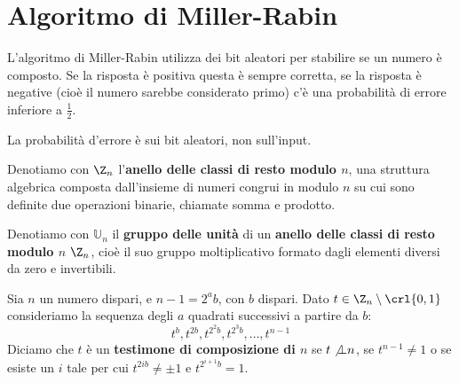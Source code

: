 \documentclass[\main/main.tex]{subfiles}
\begin{document}
\section{Algoritmo di Miller-Rabin}
\begin{multicols}{2}
\begin{observation}
    L'algoritmo di Miller-Rabin utilizza dei bit aleatori per stabilire se un numero è composto. Se la risposta è positiva questa è sempre corretta, se la risposta è negative (cioè il numero sarebbe considerato primo) c'è una probabilità di errore inferiore a \(\frac{1}{2}\).
    
    La probabilità d'errore è sui bit aleatori, non sull'input.
\end{observation}
\begin{definition}
    Denotiamo con \(\Z_n\) l'\textbf{anello delle classi di resto modulo \(n\)}, una struttura algebrica composta dall'insieme di numeri congrui in modulo \(n\) su cui sono definite due operazioni binarie, chiamate somma e prodotto.
\end{definition}
\begin{definition}
    Denotiamo con \(\mathbb{U}_n\) il \textbf{gruppo delle unità} di un \textbf{anello delle classi di resto modulo \(n\)} \(\Z_n\), cioè il suo gruppo moltiplicativo formato dagli elementi diversi da zero e invertibili.
\end{definition}
\begin{definition}
    Sia \(n\) un numero dispari, e \(n-1 = 2^a b\), con \(b\) dispari. Dato \(t \in \Z_n \setminus \crl{0,1}\) consideriamo la sequenza degli \(a\) quadrati successivi a partire da \(b\):
    \[
        t^{b}, t^{2 b}, t^{2^{2} b}, t^{2^{3} b}, \ldots, t^{n-1}
    \]
    Diciamo che \(t\) è un \textbf{testimone di composizione di \(n\)} se \(t \not\bot n\), se \(t^{n-1} \neq 1\) o se esiste un \(i\) tale per cui \(t^{2 i b} \neq \pm 1\) e \(t^{2^{i+1} b}=1\).
    

\end{definition}
\end{multicols}
\end{document}
